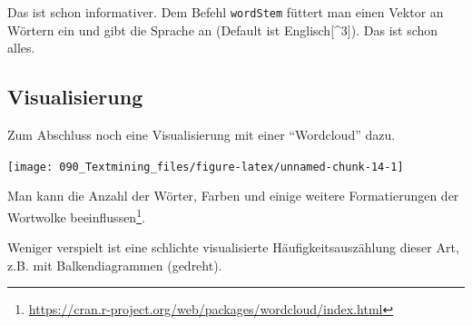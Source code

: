 \documentclass[12pt,]{book}
\newenvironment{Shaded}{\begin{snugshade}}{\end{snugshade}}
\newcommand{\KeywordTok}[1]{\textcolor[rgb]{0.13,0.29,0.53}{\textbf{{#1}}}}
\newcommand{\DataTypeTok}[1]{\textcolor[rgb]{0.13,0.29,0.53}{{#1}}}
\newcommand{\DecValTok}[1]{\textcolor[rgb]{0.00,0.00,0.81}{{#1}}}
\newcommand{\StringTok}[1]{\textcolor[rgb]{0.31,0.60,0.02}{{#1}}}
\newcommand{\NormalTok}[1]{{#1}}
\let\rmarkdownfootnote\footnote%
\def\footnote{\protect\rmarkdownfootnote}
\begin{document}
Das ist schon informativer. Dem Befehl \texttt{wordStem} füttert man
einen Vektor an Wörtern ein und gibt die Sprache an (Default ist
Englisch{[}\^{}3{]}). Das ist schon alles.

\subsection{Visualisierung}\label{visualisierung-1}

Zum Abschluss noch eine Visualisierung mit einer ``Wordcloud'' dazu.

\begin{Shaded}
\end{Shaded}

\begin{center}\texttt{[image: 090\_Textmining\_files/figure-latex/unnamed-chunk-14-1]} \end{center}

Man kann die Anzahl der Wörter, Farben und einige weitere Formatierungen
der Wortwolke beeinflussen\footnote{\url{https://cran.r-project.org/web/packages/wordcloud/index.html}}.

Weniger verspielt ist eine schlichte visualisierte Häufigkeitsauszählung
dieser Art, z.B. mit Balkendiagrammen (gedreht).
\end{document}

